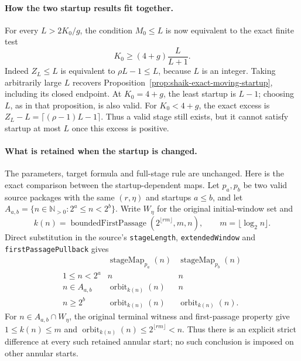 \documentclass[11pt]{article}
\theoremstyle{remark}\newtheorem{remark}[proposition]{Remark}
\begin{document}
\paragraph{How the two startup results fit together.}
For every \(L>2K_0/g\), the condition \(M_0\le L\) is now
equivalent to the exact finite test
\begin{equation}\label{eq:shaik-finite-moving-threshold}
 K_0\ge(4+g)\frac{L}{L+1}.
\end{equation}
Indeed \(Z_L\le L\) is equivalent to \(\rho L-1\le L\),
because \(L\) is an integer. Taking arbitrarily large \(L\)
recovers Proposition~\ref{prop:shaik-exact-moving-startup},
including its closed endpoint. At \(K_0=4+g\), the least
startup is \(L-1\); choosing \(L\), as in that proposition,
is also valid. For \(K_0<4+g\), the exact excess is
\(Z_L-L=\lceil(\rho-1)L-1\rceil\).
Thus a valid stage still exists, but it cannot satisfy
startup at most \(L\) once this excess is positive.

\paragraph{What is retained when the startup is changed.}
The parameters, target formula and full-stage rule are unchanged.
Here is the exact comparison between the startup-dependent maps.
Let \(p_a,p_b\) be two valid source packages with the same
\((r,\eta)\) and startups \(a\le b\), and let
\(A_{a,b}=\{n\in\mathbb N_{>0}:2^a\le n<2^b\}\).
Write \(W_\eta\) for the original initial-window set and
\[
 k(n)=\operatorname{boundedFirstPassage}
       (2^{\lfloor r m\rfloor},m,n),\qquad m=\lfloor\log_2 n\rfloor.
\]
Direct substitution in the source's \texttt{stageLength},
\texttt{extendedWindow} and \texttt{firstPassagePullback} gives
\begin{equation}\label{eq:shaik-startup-map-comparison}
 \begin{array}{c|c|c}
 &\operatorname{stageMap}_{p_a}(n)&
   \operatorname{stageMap}_{p_b}(n)\\ \hline
 1\le n<2^a&n&n\\
 n\in A_{a,b}&\operatorname{orbit}_{k(n)}(n)&n\\
 n\ge2^b&\operatorname{orbit}_{k(n)}(n)&
          \operatorname{orbit}_{k(n)}(n).
 \end{array}
\end{equation}
For \(n\in A_{a,b}\cap W_\eta\), the original terminal witness
and first-passage property give
\(1\le k(n)\le m\) and
\(\operatorname{orbit}_{k(n)}(n)\le2^{\lfloor rm\rfloor}<n\).
Thus there is an explicit strict difference at every such retained
annular start; no such conclusion is imposed on other annular starts.
\end{document}
